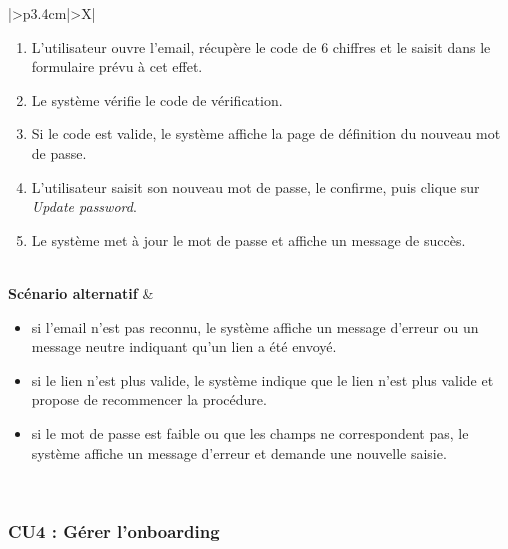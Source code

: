 ﻿\documentclass[a4paper,12pt]{report}
\begin{document}
\begin{table}[H]
\begin{tabularx}{\textwidth}{|>{\RaggedRight\arraybackslash}p{3.4cm}|>{\RaggedRight\arraybackslash}X|}
\begin{minipage}[t]{\linewidth}
\begin{enumerate}[leftmargin=*, topsep=0pt, itemsep=1pt]
    \item L'utilisateur ouvre l'email, récupère le code de 6 chiffres et le saisit dans le formulaire prévu à cet effet.
    \item Le système vérifie le code de vérification.
    \item Si le code est valide, le système affiche la page de définition du nouveau mot de passe.
    \item L'utilisateur saisit son nouveau mot de passe, le confirme, puis clique sur \textit{Update password}.
    \item Le système met à jour le mot de passe et affiche un message de succès.
\end{enumerate}
\vspace{2pt}
\end{minipage} \\
\hline
\textbf{Scénario alternatif} &
\begin{minipage}[t]{\linewidth}
\vspace{2pt}
\begin{itemize}[leftmargin=*, topsep=0pt, itemsep=1pt]
    \item si l'email n'est pas reconnu, le système affiche un message d'erreur ou un message neutre indiquant qu'un lien a été envoyé.
    \item si le lien n'est plus valide, le système indique que le lien n'est plus valide et propose de recommencer la procédure.
    \item si le mot de passe est faible ou que les champs ne correspondent pas, le système affiche un message d'erreur et demande une nouvelle saisie.
\end{itemize}
\vspace{2pt}
\end{minipage} \\
\hline
\end{tabularx}
\fussy
\end{table}

\subsubsection*{CU4 : Gérer l’onboarding}
\end{document}
